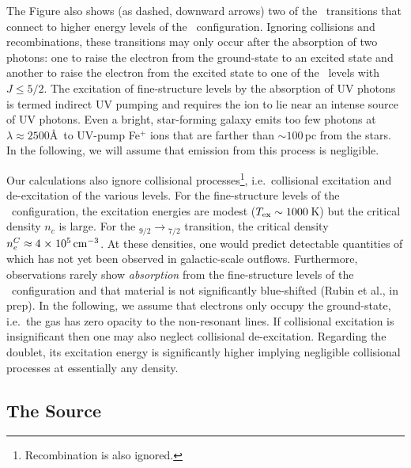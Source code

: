 \documentclass[12pt,preprint]{aastex}
\begin{document}
The Figure also shows (as dashed, downward arrows) two of the
\feiis\ transitions that connect to higher energy levels of the \zconfig\
configuration.  Ignoring collisions and recombinations, these
transitions may only occur after the absorption
of two photons: one to raise the electron from the ground-state to an
excited state and another to raise the electron from the excited state
to one of the \zconfig\ levels with $J \le 5/2$.  The excitation of
fine-structure levels by 
the absorption of UV photons is termed indirect UV pumping
\citep[e.g][]{silva02,pcb06} and requires the ion to lie
near an intense source of UV photons.  
Even a bright, star-forming galaxy emits too few photons at $\lambda
\approx 2500$\AA\ to UV-pump Fe$^+$ ions that are farther than $\sim
100$\,pc from the stars.
In the
following, we will assume that emission from this process is
negligible.

Our calculations also ignore collisional
processes\footnote{Recombination is also ignored.}, i.e.\ collisional
excitation and de-excitation of the various levels.  For the
fine-structure levels of the \aconfig\ configuration, the excitation
energies are modest ($T_{\rm ex} \sim 1000$\,K) but the critical
density $n_c$ is large.  For the \aconfig$_{9/2} \to
$\aconfig$_{7/2}$ transition, the critical density $n_e^C \approx 4
{\; \times \; 10^{5}} \, {\rm cm^{-3}}$.  At these densities, one would predict  
detectable quantities of  which has not yet been observed
in galactic-scale outflows. Furthermore, observations rarely show
{\it absorption} from the
fine-structure levels of the \aconfig\ configuration and that material
is not significantly blue-shifted (Rubin et al., in prep). 
In the following, we assume that electrons only occupy the
ground-state, i.e.\ the gas has zero opacity to the non-resonant
lines.
If collisional excitation is insignificant 
then one may also neglect collisional de-excitation.  
Regarding the  doublet, its
excitation energy is significantly higher implying 
negligible collisional processes at essentially any density.

\subsection{The Source}
\end{document}
